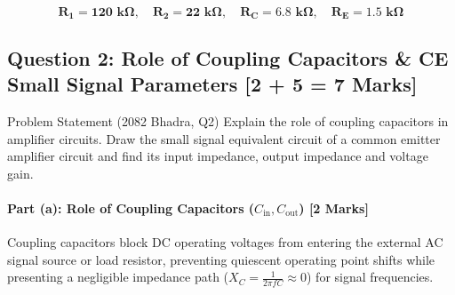 \documentclass[11pt,a4paper,oneside]{book}
\begin{document}
\begin{answerbox}
$$\mathbf{R_1 = 120\text{ k}\Omega, \quad R_2 = 22\text{ k}\Omega, \quad R_C = 6.8\text{ k}\Omega, \quad R_E = 1.5\text{ k}\Omega}$$
\end{answerbox}

\vspace{0.6cm}

\subsection{Question 2: Role of Coupling Capacitors \& CE Small Signal Parameters [2 + 5 = 7 Marks]}
\begin{questionbox}{Problem Statement (2082 Bhadra, Q2)}
Explain the role of coupling capacitors in amplifier circuits. Draw the small signal equivalent circuit of a common emitter amplifier circuit and find its input impedance, output impedance and voltage gain.
\end{questionbox}

\paragraph{Part (a): Role of Coupling Capacitors ($C_{\text{in}}, C_{\text{out}}$) [2 Marks]}
Coupling capacitors block DC operating voltages from entering the external AC signal source or load resistor, preventing quiescent operating point shifts while presenting a negligible impedance path ($X_C = \frac{1}{2\pi f C} \approx 0$) for signal frequencies.
\end{document}

